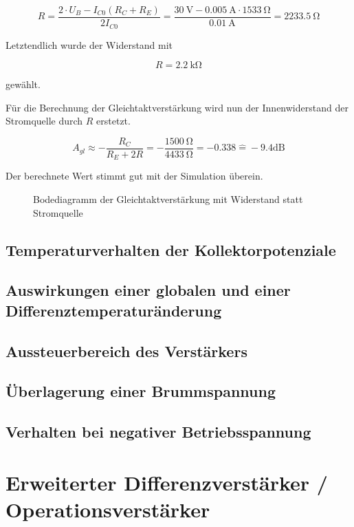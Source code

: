 \begin{equation}
    R = \frac{2\cdot U_B - I_{C0} (R_C + R_E)}{2 I_{C0} } = \frac{\SI{30}{\volt} - \SI{0.005}{\ampere} \cdot \SI{1533}{\ohm}}{\SI{0,01}{\ampere}} = \SI{2233,5}{\ohm} 
\end{equation}

Letztendlich wurde der Widerstand mit

\begin{equation}
    R = \SI{2.2}{\kilo\ohm}
\end{equation}

gewählt.

Für die Berechnung der Gleichtaktverstärkung wird nun der Innenwiderstand der Stromquelle durch $R$ erstetzt.

\begin{equation}
    A_{gl} \approx -\frac{R_C}{R_E + 2R} = -\frac{\SI{1500}{\ohm}}{\SI{4433}{\ohm}} = -0.338 \hat{ = } -9.4 \text{dB}
\end{equation}

Der berechnete Wert stimmt gut mit der Simulation überein.

\begin{figure}[H]
	\centering \small
	\scalebox{0.9}{}
	\caption{Bodediagramm der Gleichtaktverstärkung mit Widerstand statt Stromquelle}
	\label{fig_Kap5_06:Bode}
\end{figure}

\subsection{Temperaturverhalten der Kollektorpotenziale}

\subsection{Auswirkungen einer globalen und einer Differenztemperaturänderung}

\subsection{Aussteuerbereich des Verstärkers}

\subsection{Überlagerung einer Brummspannung}

\subsection{Verhalten bei negativer Betriebsspannung}

\section{Erweiterter Differenzverstärker / Operationsverstärker}





